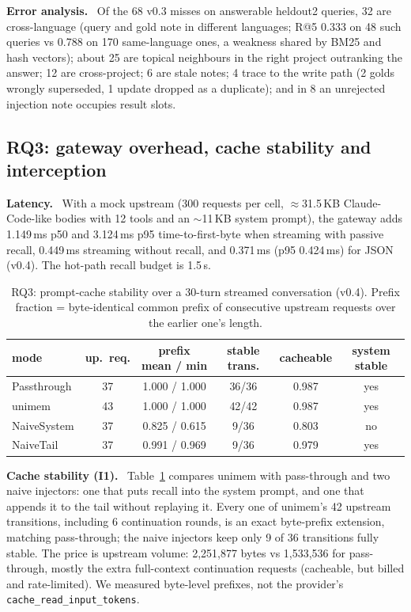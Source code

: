 \documentclass[10pt,twocolumn]{article}
\newcommand{\sys}{\textsf{unimem}}
\newcommand{\code}[1]{\texttt{\small #1}}
\newcommand{\para}[1]{\smallskip\noindent\textbf{#1}\ }
\begin{document}
\para{Error analysis.} Of the 68 v0.3 misses on answerable heldout2 queries, 32 are cross-language (query and gold note
in different languages; R@5 0.333 on 48 such queries vs 0.788 on 170 same-language ones, a weakness shared by BM25 and
hash vectors); about 25 are topical neighbours in the right project outranking the answer; 12 are cross-project; 6 are
stale notes; 4 trace to the write path (2 golds wrongly superseded, 1 update dropped as a duplicate); and in 8
an unrejected injection note occupies result slots.

\subsection{RQ3: gateway overhead, cache stability and interception}
\label{sec:rq3}

\para{Latency.} With a mock upstream (300 requests per cell, $\approx$31.5\,KB Claude-Code-like bodies with 12 tools and an
$\sim$11\,KB system prompt), the gateway adds 1.149\,ms p50 and 3.124\,ms p95 time-to-first-byte when streaming with
passive recall, 0.449\,ms streaming without recall, and 0.371\,ms (p95 0.424\,ms) for JSON (v0.4). The hot-path recall budget is
1.5\,s.

\begin{table}[t]
\centering\scriptsize
\caption{RQ3: prompt-cache stability over a 30-turn streamed conversation (v0.4). Prefix fraction = byte-identical common
prefix of consecutive upstream requests over the earlier one's length.}
\label{tab:cache}
\setlength{\tabcolsep}{2.8pt}
\begin{tabular}{@{}lccccc@{}}
\toprule
mode & up.\ req. & prefix mean / min & stable trans. & cacheable & system stable \\
\midrule
Passthrough & 37 & 1.000 / 1.000 & 36/36 & 0.987 & yes \\
\rowcolor{ours} \sys{} & 43 & 1.000 / 1.000 & 42/42 & 0.987 & yes \\
NaiveSystem & 37 & 0.825 / 0.615 & 9/36 & 0.803 & no \\
NaiveTail & 37 & 0.991 / 0.969 & 9/36 & 0.979 & yes \\
\bottomrule
\end{tabular}
\end{table}

\para{Cache stability (I1).} Table~\ref{tab:cache} compares \sys{} with pass-through and two naive injectors: one that
puts recall into the system prompt, and one that appends it to the tail without replaying it. Every one of \sys{}'s 42
upstream transitions, including 6 continuation rounds, is an exact byte-prefix extension, matching pass-through; the
naive injectors keep only 9 of 36 transitions fully stable. The price is upstream volume: 2,251,877 bytes vs 1,533,536 for
pass-through, mostly the extra full-context continuation requests (cacheable, but billed and rate-limited). We measured
byte-level prefixes, not the provider's \code{cache\_read\_input\_tokens}.
\end{document}
